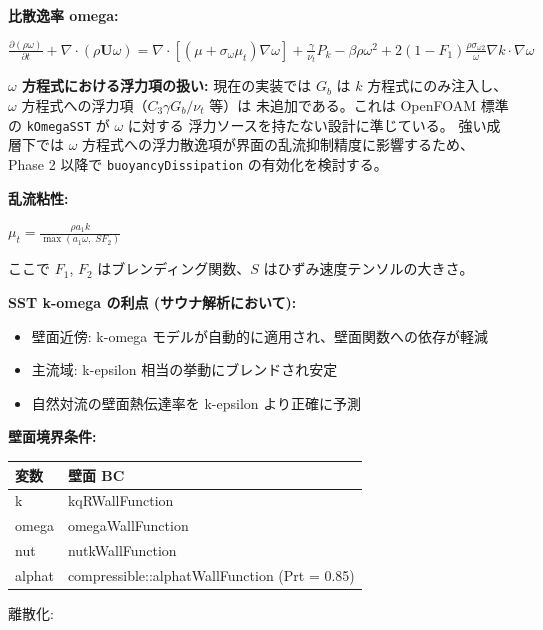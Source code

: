 \documentclass[a4paper,11pt]{article}
\begin{document}
\textbf{比散逸率 omega:}

$
\frac{\partial (\rho \omega)}{\partial t}
+ \nabla \cdot (\rho \mathbf{U} \omega)
= \nabla \cdot \left[ (\mu + \sigma_\omega \mu_t) \nabla \omega \right]
+ \frac{\gamma}{\nu_t} P_k - \beta \rho \omega^2
+ 2(1 - F_1) \frac{\rho \sigma_{\omega 2}}{\omega} \nabla k \cdot \nabla \omega
$

\textbf{$\omega$ 方程式における浮力項の扱い:}
現在の実装では $G_b$ は $k$ 方程式にのみ注入し、$\omega$ 方程式への浮力項（$C_3 \gamma G_b / \nu_t$ 等）は
未追加である。これは OpenFOAM 標準の \texttt{kOmegaSST} が $\omega$ に対する
浮力ソースを持たない設計に準じている。
強い成層下では $\omega$ 方程式への浮力散逸項が界面の乱流抑制精度に影響するため、
Phase 2 以降で \texttt{buoyancyDissipation} の有効化を検討する。

\textbf{乱流粘性:}

$
\mu_t = \frac{\rho a_1 k}{\max(a_1 \omega, \; S F_2)}
$

ここで $F_1$, $F_2$ はブレンディング関数、$S$ はひずみ速度テンソルの大きさ。

\textbf{SST k-omega の利点 (サウナ解析において):}

\begin{itemize} \item 壁面近傍: k-omega モデルが自動的に適用され、壁面関数への依存が軽減 \end{itemize}
\begin{itemize} \item 主流域: k-epsilon 相当の挙動にブレンドされ安定 \end{itemize}
\begin{itemize} \item 自然対流の壁面熱伝達率を k-epsilon より正確に予測 \end{itemize}

\textbf{壁面境界条件:}

{\small
\noindent
\begin{tabularx}{\textwidth}{|L|L|}
\hline
\textbf{変数} & \textbf{壁面 BC} \\
\hline
k & kqRWallFunction \\
\hline
omega & omegaWallFunction \\
\hline
nut & nutkWallFunction \\
\hline
alphat & compressible::alphatWallFunction (Prt = 0.85) \\
\hline
\end{tabularx}
}


離散化:
\end{document}
